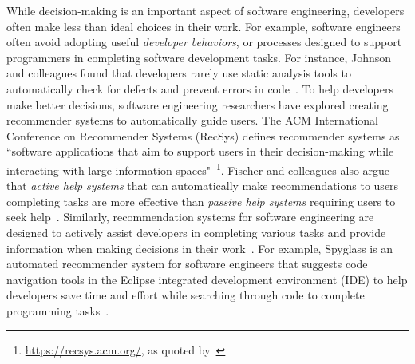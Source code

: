 While decision-making is an important aspect of software engineering, developers often make less than ideal choices in their work. For example, software engineers often avoid adopting useful \textit{developer behaviors}, or processes designed to support programmers in completing software development tasks. For instance, Johnson and colleagues found that developers rarely use static analysis tools to automatically check for defects and prevent errors in code~\cite{Johnson2013Why}. To help developers make better decisions, software engineering researchers have explored creating recommender systems to automatically guide users. The ACM International Conference on Recommender Systems (RecSys) defines recommender systems as ``software applications that aim to support users in their decision-making while interacting with large information spaces"~\footnote{\url{https://recsys.acm.org/}, as quoted by~\cite{RSSE}}. Fischer and colleagues also argue that \textit{active help systems} that can automatically make recommendations to users completing tasks are more effective than \textit{passive help systems} requiring users to seek help~\cite{Fischer1984ActiveHelpSystems}. Similarly, recommendation systems for software engineering are designed to actively assist developers in completing various tasks and provide information when making decisions in their work~\cite{RSSE}. For example, Spyglass is an automated recommender system for software engineers that suggests code navigation tools in the Eclipse integrated development environment (IDE) to help developers save time and effort while searching through code to complete programming tasks~\cite{Spyglass}. 

